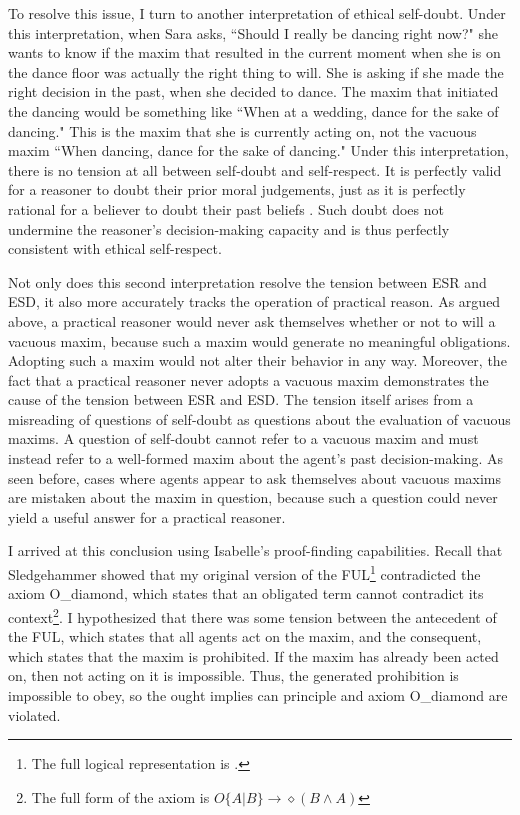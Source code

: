 \begin{isabellebody}
\begin{isamarkuptext}
To resolve this issue, I turn to another interpretation of ethical self-doubt. Under this interpretation, 
when Sara asks, ``Should I really be dancing right now?" she wants to know if the maxim that 
resulted in the current moment when she is on the dance floor was actually 
the right thing to will. She is asking if she made the right 
decision in the past, when she decided to dance. The maxim that initiated the dancing would be something 
like ``When at a wedding, dance for the sake of dancing." This is the maxim that she is currently acting 
on, not the vacuous maxim ``When dancing, dance for the sake of dancing." Under this interpretation, 
there is no tension at all between self-doubt and self-respect. It is perfectly valid for a reasoner 
to doubt their prior moral judgements, just as it is perfectly rational for a believer to doubt their 
past beliefs \cite[3-4]{christensen}. Such doubt does not undermine the reasoner's decision-making 
capacity and is thus perfectly consistent with ethical self-respect. 

Not only does this second interpretation resolve the tension between ESR and ESD, it also more accurately 
tracks the operation of practical reason. As argued above, a practical reasoner would never ask themselves 
whether or not to will a vacuous maxim, because such a maxim would generate no meaningful obligations. 
Adopting such a maxim would not alter their behavior in any way. Moreover, the fact that a practical 
reasoner never adopts a vacuous maxim demonstrates the cause of the tension between ESR and ESD.
The tension itself arises from a misreading of questions of self-doubt as questions about 
the evaluation of vacuous maxims. A question of self-doubt cannot refer to a vacuous maxim and must 
instead refer to a well-formed maxim about the agent's past decision-making. As seen before, cases where 
agents appear to ask themselves about vacuous maxims are mistaken about the maxim in question, because 
such a question could never yield a useful answer for a practical reasoner. 



I arrived at this conclusion using Isabelle's proof-finding capabilities. Recall that Sledgehammer showed
that my original version of the FUL\footnote{The full logical representation is .} contradicted
the axiom O\_diamond, which states that an obligated term cannot contradict its context\footnote{The 
full form of the axiom is $ O \{ A \vert B \} \longrightarrow \diamond (B \wedge A)$}. I hypothesized 
that there was some tension between the antecedent of the FUL, which states that all agents act on 
the maxim, and the consequent, which states that the maxim is prohibited. If the maxim has already 
been acted on, then not acting on it is impossible. Thus, the generated prohibition is impossible to 
obey, so the ought implies can principle and axiom O\_diamond are violated.


\end{isamarkuptext}
\end{isabellebody}
